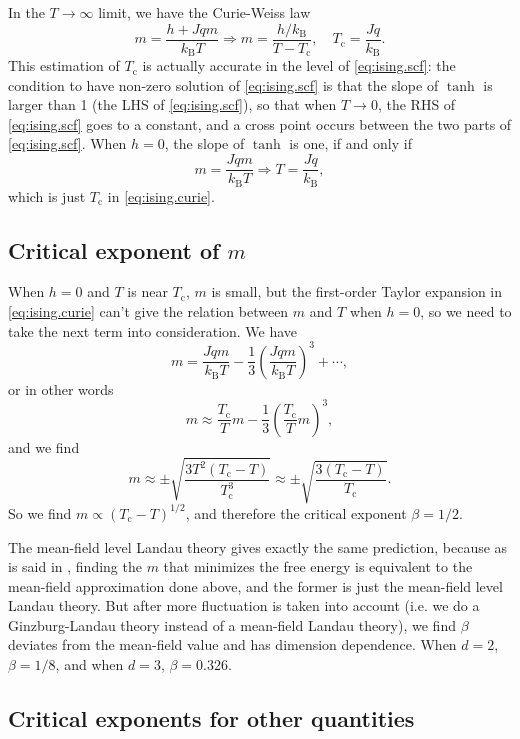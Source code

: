 \documentclass[hyperref, a4paper]{article}
\newcommand*{\Tc}{T_{\text{c}}}
\newcommand*{\kB}{k_{\text{B}}}
\begin{document}
In the $T \to \infty$ limit, we have the Curie-Weiss law 
\begin{equation}
    m = \frac{h + Jqm}{\kB T} \Rightarrow 
    m = \frac{h / \kB}{T - \Tc}, \quad 
    \Tc = \frac{Jq}{\kB}.
    \label{eq:ising.curie}
\end{equation}
This estimation of $\Tc$ is actually accurate in the level of \eqref{eq:ising.scf}: 
the condition to have non-zero solution of \eqref{eq:ising.scf} 
is that the slope of $\tanh$ is larger than 1 (the LHS of \eqref{eq:ising.scf}), 
so that when $T \to 0$, 
the RHS of \eqref{eq:ising.scf} goes to a constant, 
and a cross point occurs between the two parts of \eqref{eq:ising.scf}.
When $h = 0$, the slope of $\tanh$ is one, if and only if 
\[
    m = \frac{J q m}{\kB T} \Rightarrow T = \frac{J q}{\kB},
\]
which is just $\Tc$ in \eqref{eq:ising.curie}.

\subsection{Critical exponent of $m$}

When $h = 0$ and $T$ is near $\Tc$, 
$m$ is small,
but the first-order Taylor expansion in \eqref{eq:ising.curie} 
can't give the relation between $m$ and $T$ when $h = 0$, 
so we need to take the next term into consideration. 
We have 
\[
    m = \frac{J q m}{\kB T} - \frac{1}{3} \left(
        \frac{J q m}{\kB T}
    \right)^3 + \cdots, 
\]
or in other words 
\[
    m \approx \frac{\Tc}{T} m - \frac{1}{3} \left(
        \frac{\Tc}{T} m
    \right)^3,
\]
and we find 
\begin{equation}
    m \approx \pm \sqrt{
        \frac{3 T^2 (\Tc - T)}{\Tc^3} 
    } \approx \pm \sqrt{
        \frac{3 (\Tc - T)}{\Tc} 
    }.
\end{equation}
So we find $m \propto (\Tc - T)^{1/2}$, 
and therefore the critical exponent $\beta = 1/2$.

The mean-field level Landau theory gives exactly the same prediction, 
because as is said in , 
finding the $m$ that minimizes the free energy 
is equivalent to the mean-field approximation done above, 
and the former is just the mean-field level Landau theory. 
But after more fluctuation is taken into account 
(i.e. we do a Ginzburg-Landau theory instead of a mean-field Landau theory), 
we find $\beta$ deviates from the mean-field value and 
has dimension dependence.
When $d = 2$, $\beta = 1/8$, 
and when $d = 3$, $\beta = 0.326$.

\subsection{Critical exponents for other quantities}
\end{document}
